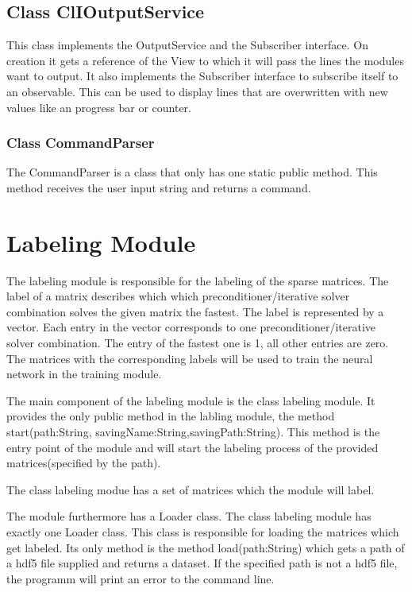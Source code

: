 \documentclass[parskip=full]{scrartcl}
\begin{document}
\subsection{Class ClIOutputService}
This class implements the OutputService and the Subscriber interface. 
On creation it gets a reference of the View to which it will pass the lines the modules want to output.
It also implements the Subscriber interface to subscribe itself to an observable.
This can be used to display lines that are overwritten with new values like an progress bar or counter.


\subsubsection{Class CommandParser}
The CommandParser is a class that only has one static public method.
This method receives the user input string and returns a command.



\section{Labeling Module}
The labeling module is responsible for the labeling of the sparse matrices. The label of a matrix describes which which \gls{preconditioner}/\gls{iterative solver} combination solves the given matrix the fastest. The label is represented by a vector. Each entry in the vector corresponds to one \gls{preconditioner}/\gls{iterative solver} combination. The entry of the fastest one is 1, all other entries are zero. The matrices with the corresponding labels will be used to train the neural network in the training module. 

The main component of the labeling module is the class labeling module. It provides the only public method in the labling module, the method start(path:String, savingName:String,savingPath:String). This method is the entry point of the module and will start the labeling process of the provided matrices(specified by the path). \newline\newline

The class labeling modue has a set of matrices which the module will label.\newline\newline

The module furthermore has a Loader class. The class labeling module has exactly one Loader class. This class is responsible for loading the matrices which get labeled. Its only method is the method load(path:String) which gets a path of a hdf5 file supplied and returns a dataset. If the specified path is not a hdf5 file, the programm will print an error to the command line. \newline\newline
\end{document}
